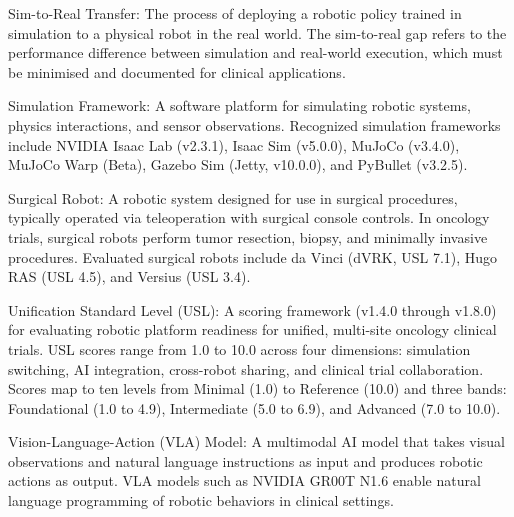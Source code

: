 Sim-to-Real Transfer: The process of deploying a robotic policy trained in simulation to a physical robot in the real world. The sim-to-real gap refers to the performance difference between simulation and real-world execution, which must be minimised and documented for clinical applications.

Simulation Framework: A software platform for simulating robotic systems, physics interactions, and sensor observations. Recognized simulation frameworks include NVIDIA Isaac Lab (v2.3.1), Isaac Sim (v5.0.0), MuJoCo (v3.4.0), MuJoCo Warp (Beta), Gazebo Sim (Jetty, v10.0.0), and PyBullet (v3.2.5).

Surgical Robot: A robotic system designed for use in surgical procedures, typically operated via teleoperation with surgical console controls. In oncology trials, surgical robots perform tumor resection, biopsy, and minimally invasive procedures. Evaluated surgical robots include da Vinci (dVRK, USL 7.1), Hugo RAS (USL 4.5), and Versius (USL 3.4).

Unification Standard Level (USL): A scoring framework (v1.4.0 through v1.8.0) for evaluating robotic platform readiness for unified, multi-site oncology clinical trials. USL scores range from 1.0 to 10.0 across four dimensions: simulation switching, AI integration, cross-robot sharing, and clinical trial collaboration. Scores map to ten levels from Minimal (1.0) to Reference (10.0) and three bands: Foundational (1.0 to 4.9), Intermediate (5.0 to 6.9), and Advanced (7.0 to 10.0).

Vision-Language-Action (VLA) Model: A multimodal AI model that takes visual observations and natural language instructions as input and produces robotic actions as output. VLA models such as NVIDIA GR00T N1.6 enable natural language programming of robotic behaviors in clinical settings.

\clearpage
\nocite{ich-e6-r3}
\printbibliography[title={Bibliography}]

